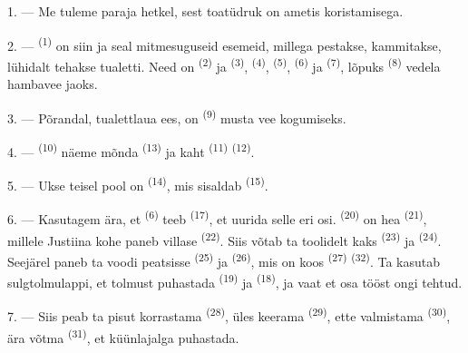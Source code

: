 \VUsaut{3.0mm}

1. --- Me tuleme paraja hetkel, sest toatüdruk on ametis  koristamisega.

2. ---  \textsuperscript{(1)} on siin ja seal mitmesuguseid
esemeid, millega pestakse, kammitakse, lühidalt tehakse tualetti. Need on
 \textsuperscript{(2)} ja  \textsuperscript{(3)},
 \textsuperscript{(4)},  \textsuperscript{(5)},
 \textsuperscript{(6)} ja  \textsuperscript{(7)}, lõpuks
 \textsuperscript{(8)} vedela hambavee jaoks.

3. --- Põrandal, tualettlaua ees, on  \textsuperscript{(9)} musta vee
kogumiseks.

4. ---  \textsuperscript{(10)} näeme mõnda 
\textsuperscript{(13)} ja kaht  \textsuperscript{(11)}
 \textsuperscript{(12)}.

5. --- Ukse teisel pool on  \textsuperscript{(14)}, mis sisaldab
 \textsuperscript{(15)}.

6. --- Kasutagem ära, et  \textsuperscript{(6)} teeb 
\textsuperscript{(17)}, et uurida selle eri osi. 
\textsuperscript{(20)} on hea  \textsuperscript{(21)}, millele
Justiina kohe paneb villase  \textsuperscript{(22)}. Siis võtab ta
toolidelt kaks  \textsuperscript{(23)} ja 
\textsuperscript{(24)}. Seejärel paneb ta voodi peatsisse 
\textsuperscript{(25)} ja  \textsuperscript{(26)}, mis on koos
 \textsuperscript{(27)}  \textsuperscript{(32)}.
Ta kasutab sulgtolmulappi, et tolmust puhastada 
\textsuperscript{(19)} ja  \textsuperscript{(18)}, ja vaat et
osa tööst ongi tehtud.

7. --- Siis peab ta pisut korrastama  \textsuperscript{(28)}, üles
keerama  \textsuperscript{(29)}, ette valmistama 
\textsuperscript{(30)}, ära võtma  \textsuperscript{(31)}, et küünlajalga
puhastada.

\VUsaut{5.0mm}
\VUsaut{3.0mm}

